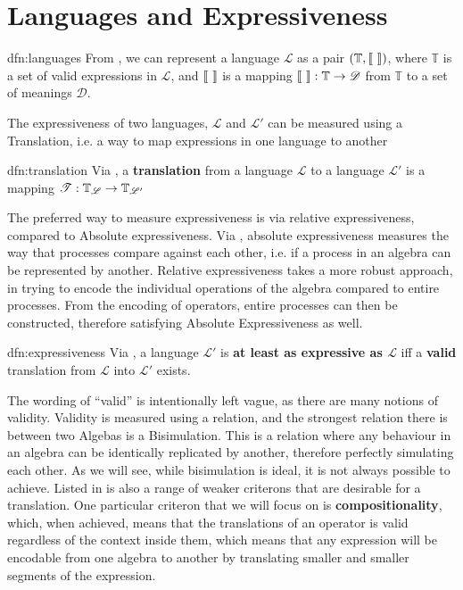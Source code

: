 \documentclass[../hons_project.tex]{subfiles}
\begin{document}
    
\section{Languages and Expressiveness}\label{ssec:language}

\begin{dfn}[Languages]{dfn:languages}{}
   From \cite{DBLP:conf/fossacs/Glabbeek18}, we can represent a language $\mathscr{L}$ as a pair $(\mathbb{T}, \llbracket \,\, \rrbracket)$, where $\mathbb{T}$ is a set of valid expressions in $\mathscr{L}$, and $\llbracket \,\, \rrbracket$ is a mapping $\llbracket \,\, \rrbracket : \mathbb{T} \to \mathscr{D}$ from $\mathbb{T}$ to a set of meanings $\mathscr{D}$.
\end{dfn}

The expressiveness of two languages, $\mathscr{L}$ and $\mathscr{L}'$ can be measured using a Translation, i.e. a way to map expressions in one language to another
\begin{dfn}[Translation]{dfn:translation}{}
   Via  \cite{DBLP:conf/fossacs/Glabbeek18}, a \textbf{translation} from a language $\mathscr{L}$ to a language $\mathscr{L'}$ is a mapping $\mathscr{T} : \mathbb{T}_{\mathscr{L}} \to \mathbb{T}_{\mathscr{L}'}$
\end{dfn}



The preferred way to measure expressiveness is via relative expressiveness, compared to Absolute expressiveness. Via \cite{parrowExpressivenessProcessAlgebras2008}, absolute expressiveness measures the way that processes compare against each other, i.e. if a process in an algebra can be represented by another. Relative expressiveness takes a more robust approach, in trying to encode the individual operations of the algebra compared to entire processes. From the encoding of operators, entire processes can then be constructed, therefore satisfying Absolute Expressiveness as well.

\begin{dfn}[Expressiveness]{dfn:expressiveness}{}
   Via  \cite{DBLP:conf/fossacs/Glabbeek18}, a language $\mathscr{L}'$ is \textbf{at least as expressive as $\mathscr{L}$} iff a \textbf{valid} translation from $\mathscr{L}$ into $\mathscr{L}'$ exists.
\end{dfn}

The wording of ``valid'' is intentionally left vague, as there are many notions of validity. Validity is measured using a relation, and the strongest relation there is between two Algebas is a Bisimulation. This is a relation where any behaviour in an algebra can be identically replicated by another, therefore perfectly simulating each other. As we will see, while bisimulation is ideal, it is not always possible to achieve. Listed in \cite{parrowExpressivenessProcessAlgebras2008} is also a range of weaker criterons that are desirable for a translation. One particular criteron that we will focus on is \textbf{compositionality}, which, when achieved, means that the translations of an operator is valid regardless of the context inside them, which means that any expression will be encodable from one algebra to another by translating smaller and smaller segments of the expression.
\end{document}
